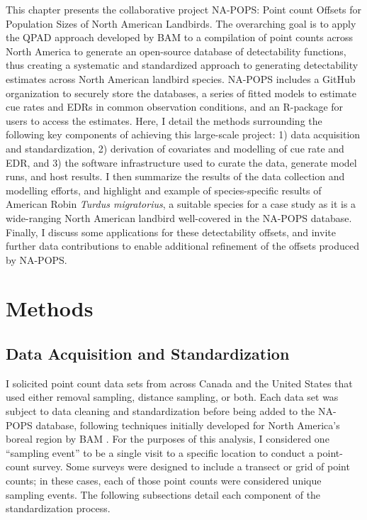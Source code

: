 \par This chapter presents the collaborative project NA-POPS: Point count Offsets for Population Sizes of North American Landbirds. The overarching goal is to apply the QPAD approach developed by BAM to a compilation of point counts across North America to generate an open-source database of detectability functions, thus creating a systematic and standardized approach to generating detectability estimates across North American landbird species. NA-POPS includes a GitHub organization \citep{blischak_quick_2016, crystal-ornelas_not_2022} to securely store the databases, a series of fitted models to estimate cue rates and EDRs in common observation conditions, and an R-package for users to access the estimates. Here, I detail the methods surrounding the following key components of achieving this large-scale project: 1) data acquisition and standardization, 2) derivation of covariates and modelling of cue rate and EDR, and 3) the software infrastructure used to curate the data, generate model runs, and host results. I then summarize the results of the data collection and modelling efforts, and highlight and example of species-specific results of American Robin \textit{Turdus migratorius}, a suitable species for a case study as it is a wide-ranging North American landbird well-covered in the NA-POPS database. Finally, I discuss some applications for these detectability offsets, and invite further data contributions to enable additional refinement of the offsets produced by NA-POPS.


\section{Methods}
\subsection{Data Acquisition and Standardization}
\par I solicited point count data sets from across Canada and the United States that used either removal sampling, distance sampling, or both. Each data set was subject to data cleaning and standardization before being added to the NA-POPS database, following techniques initially developed for North America’s boreal region by BAM \citep{cumming_toward_2010, barker_ecological_2015}. For the purposes of this analysis, I considered one “sampling event” to be a single visit to a specific location to conduct a point-count survey. Some surveys were designed to include a transect or grid of point counts; in these cases, each of those point counts were considered unique sampling events. The following subsections detail each component of the standardization process.

